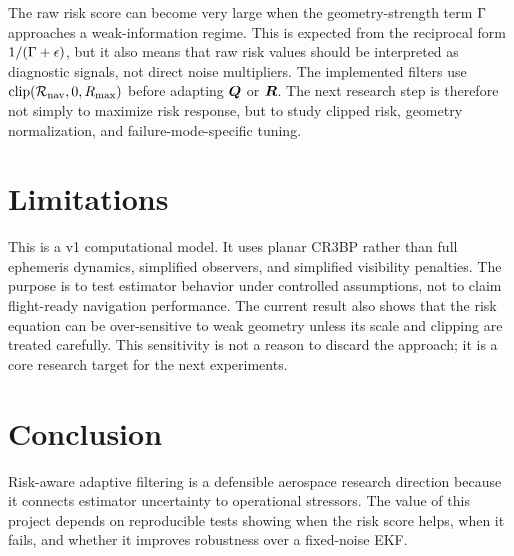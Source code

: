 \documentclass[11pt]{article}
\begin{document}
The raw risk score can become very large when the geometry-strength term
$\Gamma$ approaches a weak-information regime. This is expected from the
reciprocal form $1/(\Gamma+\epsilon)$, but it also means that raw risk
values should be interpreted as diagnostic signals, not direct noise multipliers.
The implemented filters use $\mathrm{clip}(\mathcal{R}_{\mathrm{nav}},0,R_{\max})$ before adapting
$\bm{Q}$ or $\bm{R}$. The next research step is therefore not simply to maximize
risk response, but to study clipped risk, geometry normalization, and
failure-mode-specific tuning.

\section{Limitations}

This is a v1 computational model. It uses planar CR3BP rather than full
ephemeris dynamics, simplified observers, and simplified visibility penalties.
The purpose is to test estimator behavior under controlled assumptions, not to
claim flight-ready navigation performance. The current result also shows that
the risk equation can be over-sensitive to weak geometry unless its scale and
clipping are treated carefully. This sensitivity is not a reason to discard the
approach; it is a core research target for the next experiments.

\section{Conclusion}

Risk-aware adaptive filtering is a defensible aerospace research direction
because it connects estimator uncertainty to operational stressors. The value
of this project depends on reproducible tests showing when the risk score helps,
when it fails, and whether it improves robustness over a fixed-noise EKF.

\sloppy


\end{document}
